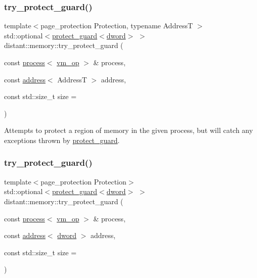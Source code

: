 \subsubsection{\texorpdfstring{try\+\_\+protect\+\_\+guard()}{try\_protect\_guard()}\hspace{0.1cm}{\footnotesize\ttfamily [1/2]}}
{\footnotesize\ttfamily template$<$page\+\_\+protection Protection, typename AddressT $>$ \\
std\+::optional$<$\mbox{\hyperlink{classdistant_1_1memory_1_1protect__guard}{protect\+\_\+guard}}$<$\mbox{\hyperlink{namespacedistant_a9fa41a5a1a17dcbd24da1c1855c92489}{dword}}$>$ $>$ distant\+::memory\+::try\+\_\+protect\+\_\+guard (\begin{DoxyParamCaption}\item[{const \mbox{\hyperlink{classdistant_1_1kernel__objects_1_1process}{process}}$<$ \mbox{\hyperlink{namespacedistant_af02d4223cd2f509cc373ac9d83655f19}{vm\+\_\+op}} $>$ \&}]{process,  }\item[{const \mbox{\hyperlink{classdistant_1_1memory_1_1address}{address}}$<$ AddressT $>$}]{address,  }\item[{const std\+::size\+\_\+t}]{size = {} }\end{DoxyParamCaption})}



Attempts to protect a region of memory in the given process, but will catch any exceptions thrown by \mbox{\hyperlink{classdistant_1_1memory_1_1protect__guard}{protect\+\_\+guard}}. 

\mbox{\label{namespacedistant_1_1memory_a60d112d11d35e12bc9482612aa4fa54e}} 
\subsubsection{\texorpdfstring{try\+\_\+protect\+\_\+guard()}{try\_protect\_guard()}\hspace{0.1cm}{\footnotesize\ttfamily [2/2]}}
{\footnotesize\ttfamily template$<$page\+\_\+protection Protection$>$ \\
std\+::optional$<$\mbox{\hyperlink{classdistant_1_1memory_1_1protect__guard}{protect\+\_\+guard}}$<$\mbox{\hyperlink{namespacedistant_a9fa41a5a1a17dcbd24da1c1855c92489}{dword}}$>$ $>$ distant\+::memory\+::try\+\_\+protect\+\_\+guard (\begin{DoxyParamCaption}\item[{const \mbox{\hyperlink{classdistant_1_1kernel__objects_1_1process}{process}}$<$ \mbox{\hyperlink{namespacedistant_af02d4223cd2f509cc373ac9d83655f19}{vm\+\_\+op}} $>$ \&}]{process,  }\item[{const \mbox{\hyperlink{classdistant_1_1memory_1_1address}{address}}$<$ \mbox{\hyperlink{namespacedistant_a9fa41a5a1a17dcbd24da1c1855c92489}{dword}} $>$}]{address,  }\item[{const std\+::size\+\_\+t}]{size = {} }\end{DoxyParamCaption})}

